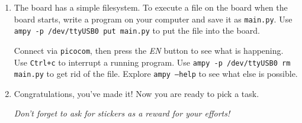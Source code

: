 \documentclass[a4paper,10pt]{article}
\begin{document}
\begin{enumerate}[resume]

\item The board has a simple filesystem.
      To execute a file on the board when the board starts,
      write a program on your computer and save it as \texttt{main.py}.
      Use \texttt{ampy -p /dev/ttyUSB0 put main.py} to put the file into the board.

      Connect via \texttt{picocom}, then press the \emph{EN} button to see
      what is happening. Use \texttt{Ctrl+c} to interrupt a running program.
      Use \texttt{ampy -p /dev/ttyUSB0 rm main.py} to get rid of the file.
      Explore \texttt{ampy --help} to see what else is possible.

\item Congratulations, you've made it! Now you are ready to pick a task.

    \textit{
    Don't forget to ask for stickers as a reward for your efforts!
    }

\end{enumerate}
\end{document}
